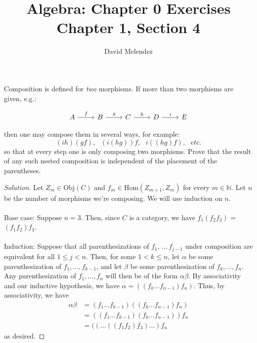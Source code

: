 \documentclass[12pt]{article}
\newenvironment{problem}[2][Problem]{\begin{trivlist}
\item[\hskip \labelsep {\bfseries #1}\hskip \labelsep {\bfseries #2.}]}{\end{trivlist}}
\newenvironment{solution}
  {\renewcommand\qedsymbol{$\blacksquare$}\begin{proof}[Solution]}
        {\end{proof}}
\begin{document}
\title{Algebra: Chapter 0 Exercises\\ \large Chapter 1, Section 4}
\author{David Melendez}
\maketitle

\begin{problem}{4.1}
    Composition is defined for \textit{two} morphisms. 
    If more than two morphisms are given, e.g.:

    \[\begin{tikzcd}
        A \ar[r,"f"] & B \ar[r,"g"] & C \ar[r,"h"] & D \ar[r,"i"] & E
    \end{tikzcd}\]

    then one may compose them in several ways, for example:
    \begin{equation*}
        (ih)(gf),\,\,\,\, (i(hg))f,\,\,\,\, i((hg)f),\,\,\,\, etc.
    \end{equation*}
    so that at every step one is only composing two morphisms. 
    Prove that the result of any such nested composition is independent of the placement of the parentheses.
\end{problem}
\begin{solution}
  Let $Z_m \in \text{Obj}(C)$ and $f_m \in \text{Hom}{(Z_{m+1}, Z_{m})}$ for every $m \in \mathbb{N}$. 
  Let $n$ be the number of morphisms we're composing.
  We will use induction on $n$.
  \\\\Base case: Suppose $n=3$. 
  Then, since $C$ is a category, we have $f_1(f_2f_3)$ = $(f_1f_2)f_3$.
  \\\\Induction: Suppose that all parenthesizations of $f_1,\, \ldots\, f_{j-1}$ under composition are equivalent for all $1 \leq j < n$.
  Then, for some $1 < k \leq n$, let $\alpha$ be some parenthesization of $f_1, \ldots, f_{k-1}$, and let $\beta$ be some parenthesization of $f_k, \ldots, f_{n}$.
  Any parenthesization of $f_1, \ldots, f_n$ will then be of the form $\alpha\beta$.
  By associativity and our inductive hypothesis, we have $\alpha=\left( (f_k \ldots f_{n-1})f_n \right)$. Thus, by associativity, we have
  \begin{align*}
    \alpha\beta &= (f_1\ldots f_{k-1})\left( (f_k\ldots f_{n-1})f_n \right) \\
    &= \left( (f_1 \ldots f_{k-1})(f_k \ldots f_{n-1}) \right)f_n \\
    &= ((\ldots((f_1f_2)f_3)\ldots)f_n
  \end{align*}
  as desired.
\end{solution}
\end{document}
